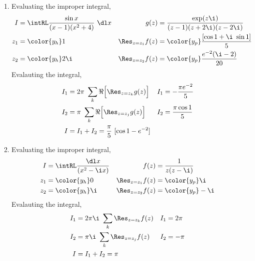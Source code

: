 \begin{enumerate}
    \item Evaluating the improper integral,
          \begin{align}
              I                   & = \intRL \frac{\sin x}{(x-1)(x^2 + 4)}\ \dl x &
              g(z)                & = \frac{\exp(z\i)}{(z - 1)(z + 2\i)(z - 2\i)}   \\
              z_1                 & = \color{y_h} 1                               &
              \Res_{z = z_1} f(z) & = \color{y_p} \frac{[\cos 1 + \i\ \sin 1]}
              {5}                                                                   \\
              z_2                 & = \color{y_h} 2\i                             &
              \Res_{z = z_2} f(z) & = \color{y_p} \frac{e^{-2}(\i - 2)}{20}
          \end{align}
          Evalauting the integral,
          \begin{align}
              I_1 & = 2\pi\ \sum_{k} \Re{\Big[\Res_{z = z_k} g(z)\Big]} &
              I_1 & = -\frac{\pi e^{-2}}{5}                               \\
              I_2 & = \pi\ \sum_{k} \Re{\Big[\Res_{z = z_j} g(z)\Big]}  &
              I_2 & = \frac{\pi \cos 1}{5}                                \\
              I   & = I_1 + I_2 = \frac{\pi}{5}\ [\cos 1 - e^{-2}]
          \end{align}

    \item Evaluating the improper integral,
          \begin{align}
              I                   & = \intRL \frac{\dl x}{(x^2 - \i x)} &
              f(z)                & = \frac{1}{z(z - \i)}                 \\
              z_1                 & = \color{y_h} 0                     &
              \Res_{z = z_1} f(z) & = \color{y_p} \i                      \\
              z_2                 & = \color{y_h} \i                    &
              \Res_{z = z_2} f(z) & = \color{y_p} -\i
          \end{align}
          Evalauting the integral,
          \begin{align}
              I_1 & = 2\pi\i\ \sum_{k} \Res_{z = z_k} f(z) &
              I_1 & = 2\pi                                   \\
              I_2 & = \pi\i\ \sum_{k} \Res_{z = z_j} f(z)  &
              I_2 & = -\pi                                   \\
              I   & = I_1 + I_2 = \pi
          \end{align}


\end{enumerate}
